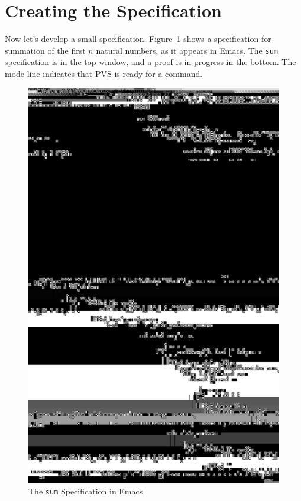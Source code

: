 \section{Creating the Specification}

Now let's develop a small specification.  Figure~\ref{sum-screen} shows
a specification for summation of the first $n$ natural numbers, as it
appears in Emacs.  The \texttt{sum} specification is in the top window,
and a proof is in progress in the bottom.  The mode line indicates that
PVS is ready for a command.

\begin{figure}
\includegraphics[scale=.5]{pvs-screen1}
\caption{The \texttt{sum} Specification in Emacs}\label{sum-screen}
\end{figure}

